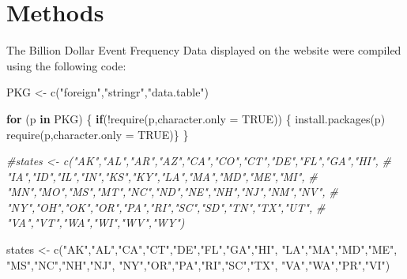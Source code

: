 \documentclass[
]{book}
\newenvironment{Shaded}{\begin{snugshade}}{\end{snugshade}}
\newcommand{\AttributeTok}[1]{\textcolor[rgb]{0.77,0.63,0.00}{#1}}
\newcommand{\CommentTok}[1]{\textcolor[rgb]{0.56,0.35,0.01}{\textit{#1}}}
\newcommand{\ConstantTok}[1]{\textcolor[rgb]{0.00,0.00,0.00}{#1}}
\newcommand{\ControlFlowTok}[1]{\textcolor[rgb]{0.13,0.29,0.53}{\textbf{#1}}}
\newcommand{\FunctionTok}[1]{\textcolor[rgb]{0.00,0.00,0.00}{#1}}
\newcommand{\NormalTok}[1]{#1}
\newcommand{\OtherTok}[1]{\textcolor[rgb]{0.56,0.35,0.01}{#1}}
\newcommand{\SpecialCharTok}[1]{\textcolor[rgb]{0.00,0.00,0.00}{#1}}
\newcommand{\StringTok}[1]{\textcolor[rgb]{0.31,0.60,0.02}{#1}}
\begin{document}
\hypertarget{methods-19}{%
\section{Methods}\label{methods-19}}

The Billion Dollar Event Frequency Data displayed on the website were compiled using the following code:

\begin{Shaded}
\begin{Highlighting}[]
\NormalTok{PKG }\OtherTok{\textless{}{-}} \FunctionTok{c}\NormalTok{(}\StringTok{"foreign"}\NormalTok{,}\StringTok{"stringr"}\NormalTok{,}\StringTok{"data.table"}\NormalTok{)}

\ControlFlowTok{for}\NormalTok{ (p }\ControlFlowTok{in}\NormalTok{ PKG) \{}
  \ControlFlowTok{if}\NormalTok{(}\SpecialCharTok{!}\FunctionTok{require}\NormalTok{(p,}\AttributeTok{character.only =} \ConstantTok{TRUE}\NormalTok{)) \{  }
    \FunctionTok{install.packages}\NormalTok{(p)}
    \FunctionTok{require}\NormalTok{(p,}\AttributeTok{character.only =} \ConstantTok{TRUE}\NormalTok{)\}}
\NormalTok{\}}

\CommentTok{\#states \textless{}{-} c("AK","AL","AR","AZ","CA","CO","CT","DE","FL","GA","HI",}
\CommentTok{\#            "IA","ID","IL","IN","KS","KY","LA","MA","MD","ME","MI",}
\CommentTok{\#            "MN","MO","MS","MT","NC","ND","NE","NH","NJ","NM","NV",}
\CommentTok{\#            "NY","OH","OK","OR","PA","RI","SC","SD","TN","TX","UT",}
\CommentTok{\#           "VA","VT","WA","WI","WV","WY")}

\NormalTok{states }\OtherTok{\textless{}{-}} \FunctionTok{c}\NormalTok{(}\StringTok{"AK"}\NormalTok{,}\StringTok{"AL"}\NormalTok{,}\StringTok{"CA"}\NormalTok{,}\StringTok{"CT"}\NormalTok{,}\StringTok{"DE"}\NormalTok{,}\StringTok{"FL"}\NormalTok{,}\StringTok{"GA"}\NormalTok{,}\StringTok{"HI"}\NormalTok{,}
            \StringTok{"LA"}\NormalTok{,}\StringTok{"MA"}\NormalTok{,}\StringTok{"MD"}\NormalTok{,}\StringTok{"ME"}\NormalTok{,}
            \StringTok{"MS"}\NormalTok{,}\StringTok{"NC"}\NormalTok{,}\StringTok{"NH"}\NormalTok{,}\StringTok{"NJ"}\NormalTok{,}
            \StringTok{"NY"}\NormalTok{,}\StringTok{"OR"}\NormalTok{,}\StringTok{"PA"}\NormalTok{,}\StringTok{"RI"}\NormalTok{,}\StringTok{"SC"}\NormalTok{,}\StringTok{"TX"}\NormalTok{,}
            \StringTok{"VA"}\NormalTok{,}\StringTok{"WA"}\NormalTok{,}\StringTok{"PR"}\NormalTok{,}\StringTok{"VI"}\NormalTok{)}


\end{Highlighting}
\end{Shaded}
\end{document}
